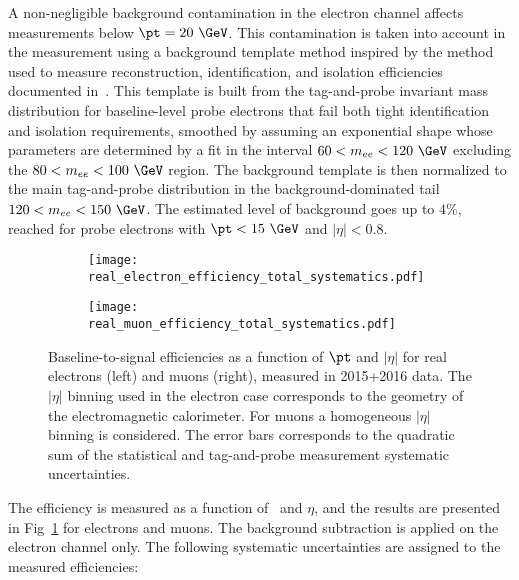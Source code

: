 A non-negligible background contamination in the electron channel affects measurements below $\pt=20~\GeV$. 
This contamination is taken into account in the measurement using a background template method inspired by the method used to measure reconstruction, identification, and 
isolation efficiencies documented in~\cite{ATLAS-CONF-2014-032}. 
This template is built from the tag-and-probe invariant mass distribution for baseline-level probe electrons that fail both tight identification
 and isolation requirements, smoothed by assuming an exponential shape whose parameters are determined by a fit in the interval $60<m_{ee}<120~\GeV$ excluding the $80<m_{ee}< 100~\GeV$ region. 
The background template is then normalized to the main tag-and-probe distribution in the background-dominated tail $120<m_{ee}<150~\GeV$. 
The estimated level of background goes up to $4\%$, reached for probe electrons with $\pt<15~\GeV$ and $|\eta|<0.8$. 

\begin{figure}[t!]
\centering
\begin{subfigure}{0.49\textwidth}
\texttt{[image: real\_electron\_efficiency\_total\_systematics.pdf]}
\end{subfigure}
\begin{subfigure}{0.49\textwidth}
\texttt{[image: real\_muon\_efficiency\_total\_systematics.pdf]}
\end{subfigure}
\caption{Baseline-to-signal efficiencies as a function of $\pt$ and $|\eta|$ for real electrons (left) and muons (right), measured in 2015+2016 data.
The $|\eta|$ binning used in the electron case corresponds to the geometry of the electromagnetic calorimeter.
For muons a homogeneous $|\eta|$ binning is considered.
The error bars corresponds to the quadratic sum of the statistical and tag-and-probe measurement systematic uncertainties.}
\label{fig:prompt_leptons_eff}
\end{figure}

The efficiency is measured as a function of \pt\ and $\eta$, and the results are presented in Fig~\ref{fig:prompt_leptons_eff} for electrons and muons. 
The background subtraction is applied on the electron channel only. 
The following systematic uncertainties are assigned to the measured efficiencies: 

